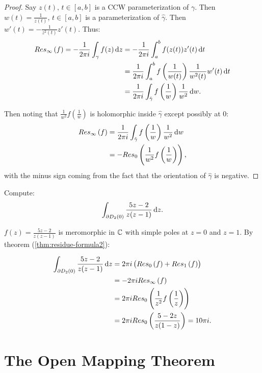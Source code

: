 \begin{proof}
Say $z(t), \, t \in [a,b]$ is a CCW parameterization of $\gamma$. Then $w(t) = \frac{1}{z(t)}, \, t \in [a,b]$ is a parameterization of $\hat{\gamma}$. Then $w'(t) =- \frac{1}{z^2(t)} z'(t)$. Thus:
\begin{align*}
    \res{\infty}{f} = - \frac{1}{2 \pi i} \int_\gamma f(z) \dif z &= - \frac{1}{2 \pi i} \int_a^b f(z(t)) z'(t) \dif t\\
    &= \frac{1}{2 \pi i} \int_a^b f  \left( \frac{1}{w(t)} \right) \frac{1}{w^2(t)} w'(t) \dif t\\
    &= \frac{1}{2 \pi i} \int_{\hat{\gamma}} f \left( \frac{1}{w} \right) \frac{1}{w^2} \dif w.
\end{align*}

Then noting that $\frac{1}{w^2} f \left( \frac{1}{w} \right)$ is holomorphic inside $\hat{\gamma}$ except possibly at $0$:
\begin{align*}
    \res{\infty}{f} &= \frac{1}{2 \pi i} \int_{\hat{\gamma}} f \left( \frac{1}{w} \right) \frac{1}{w^2} \dif w\\
    &= - \res{0}{\frac{1}{w^2} f \left( \frac{1}{w} \right)},
\end{align*}
with the minus sign coming from the fact that the orientation of $\hat{\gamma}$ is negative.


\end{proof}


\begin{example}

Compute:
\begin{align*}
    \int_{\partial D_2(0)} \frac{5z-2}{z(z-1)} \dif z.
\end{align*}

$f(z) = \frac{5z-2}{z(z-1)}$ is meromorphic in $\mathbb{C}$ with simple poles at $z=0$ and $z=1$. By theorem (\ref{thm:residue-formula2}):

\begin{align*}
    \int_{\partial D_2(0)} \frac{5z-2}{z(z-1)} \dif z &= 2 \pi i \left( \res{0}{f} + \res{1}{f} \right)\\
    &= - 2 \pi i \res{\infty }{f}\\
    &= 2 \pi i \res{0}{\frac{1}{z^2} f\left( \frac{1}{z} \right)}\\
    &= 2 \pi i \res{0}{\frac{5-2z}{z(1-z)}} = 10 \pi i.
\end{align*}
\end{example}


\section{The Open Mapping Theorem}


